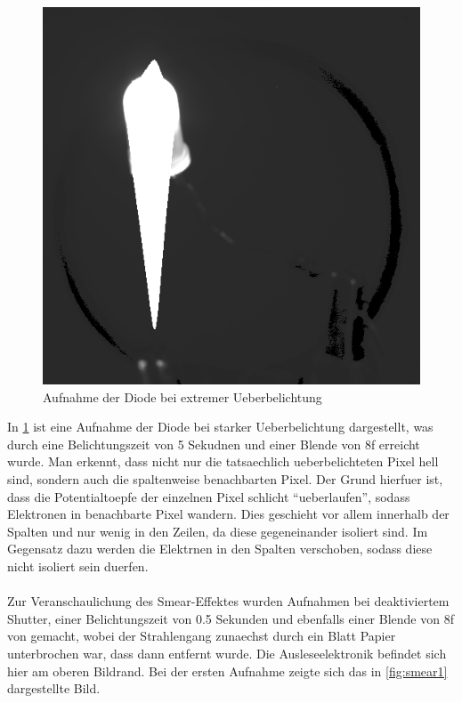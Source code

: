 \begin{figure}[h!]
        \includegraphics[width=.4\textwidth]{blooming.png}
\caption{ Aufnahme der Diode bei extremer Ueberbelichtung }
\label{fig:blooming}
\end{figure}
In \ref{fig:blooming} ist eine Aufnahme der Diode bei starker Ueberbelichtung dargestellt, was durch eine Belichtungszeit von 5 Sekudnen und einer Blende von 8f erreicht wurde. Man erkennt, dass nicht nur die tatsaechlich ueberbelichteten Pixel hell sind, sondern auch die spaltenweise benachbarten Pixel. Der Grund hierfuer ist, dass die Potentialtoepfe der einzelnen Pixel schlicht \enquote{ueberlaufen}, sodass Elektronen in benachbarte Pixel wandern. Dies geschieht vor allem innerhalb der Spalten und nur wenig in den Zeilen, da diese gegeneinander isoliert sind. Im Gegensatz dazu werden die Elektrnen in den Spalten verschoben, sodass diese nicht isoliert sein duerfen. \\ \\
Zur Veranschaulichung des Smear-Effektes wurden Aufnahmen bei deaktiviertem Shutter, einer Belichtungszeit von 0.5 Sekunden und ebenfalls einer Blende von 8f von gemacht, wobei der Strahlengang zunaechst durch ein Blatt Papier unterbrochen war, dass dann entfernt wurde. Die Ausleseelektronik befindet sich hier am oberen Bildrand. 
Bei der ersten Aufnahme zeigte sich das in \ref{fig:smear1} dargestellte Bild. 

